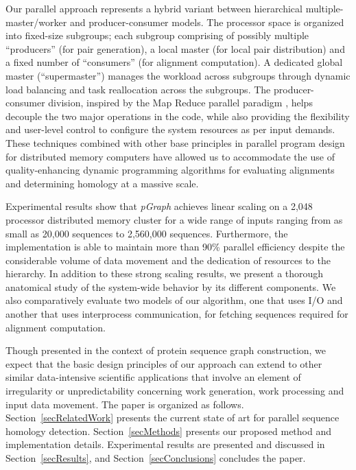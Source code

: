 \documentclass[10pt,journal,letterpaper,compsoc]{IEEEtran}
\begin{document}
Our parallel approach represents a hybrid variant between hierarchical multiple-master/worker and producer-consumer models. The processor space is organized into fixed-size subgroups; each subgroup comprising of possibly multiple ``producers'' (for pair generation), a local master (for local pair distribution) and a fixed number of ``consumers'' (for alignment computation). A dedicated global master (``supermaster'') manages the workload across subgroups through dynamic load balancing and task reallocation across the subgroups. The producer-consumer division, inspired by the Map Reduce parallel paradigm \cite{Dean08}, helps decouple the two major operations in the code, while also providing the flexibility and user-level control to configure the system resources as per input demands. These techniques combined with other base principles in parallel program design for distributed memory computers have allowed us to accommodate the use of quality-enhancing dynamic programming algorithms for evaluating alignments and determining homology at a massive scale. 

Experimental results show that {\it pGraph} achieves linear scaling on a 2,048 processor distributed memory cluster for a wide range of inputs ranging from as small as 20,000 sequences to 2,560,000 sequences. Furthermore, the implementation is able to maintain more than 90\% parallel efficiency despite the considerable volume of data movement and the dedication of resources to the hierarchy. In addition to these strong scaling results, we present a thorough anatomical study of the system-wide behavior by its different components. We also comparatively evaluate two models of our algorithm, one that uses I/O and another that uses interprocess communication, for fetching sequences required for alignment computation. 

Though presented in the context of protein sequence graph construction, we expect that the basic design principles of our approach can extend to other similar data-intensive scientific applications that involve an element of irregularity or unpredictability concerning work generation, work processing and input data movement.
The paper is organized as follows. Section~\ref{secRelatedWork} presents the current state of art for parallel sequence homology detection. Section~\ref{secMethods} presents our proposed method and implementation details. Experimental results are presented and discussed in Section~\ref{secResults}, and Section~\ref{secConclusions} concludes the paper.
\end{document}
